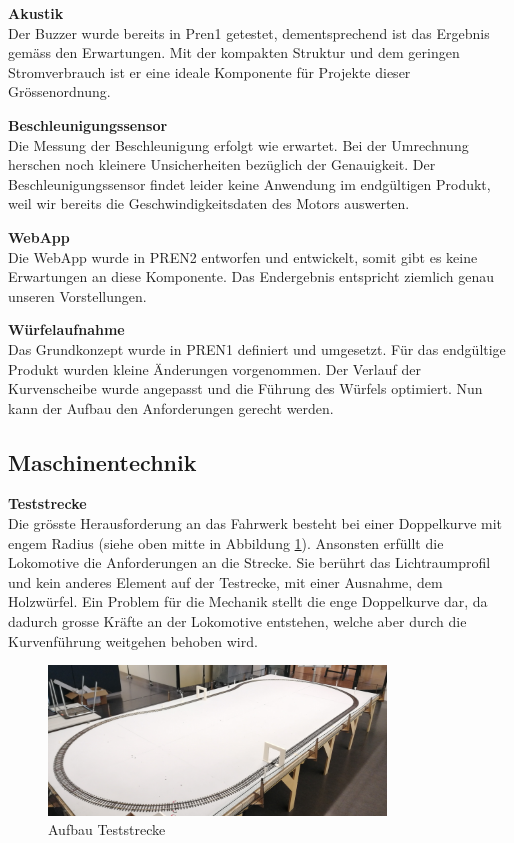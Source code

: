 \documentclass[../../main.tex]{subfiles}
\begin{document}
\textbf{Akustik}\\
Der Buzzer wurde bereits in Pren1 getestet, dementsprechend ist das Ergebnis gemäss den Erwartungen. Mit der kompakten Struktur und dem geringen Stromverbrauch ist er eine ideale Komponente für Projekte dieser Grössenordnung.

\textbf{Beschleunigungssensor}\\
Die Messung der Beschleunigung erfolgt wie erwartet. Bei der Umrechnung herschen noch kleinere Unsicherheiten bezüglich der Genauigkeit. Der Beschleunigungssensor findet leider keine Anwendung im endgültigen Produkt, weil wir bereits die Geschwindigkeitsdaten des Motors auswerten.

\textbf{WebApp}\\
Die WebApp wurde in PREN2 entworfen und entwickelt, somit gibt es keine Erwartungen an diese Komponente. Das Endergebnis entspricht ziemlich genau unseren Vorstellungen.

\textbf{Würfelaufnahme}\\
Das Grundkonzept wurde in PREN1 definiert und umgesetzt. Für das endgültige Produkt wurden kleine Änderungen vorgenommen. Der Verlauf der Kurvenscheibe wurde angepasst und die Führung des Würfels optimiert. Nun kann der Aufbau den Anforderungen gerecht werden. 

\pagebreak

\subsection{Maschinentechnik}

\textbf{Teststrecke}\\
Die grösste Herausforderung an das Fahrwerk besteht bei einer Doppelkurve mit engem Radius (siehe oben mitte in Abbildung \ref{fig:teststrecke1}). Ansonsten erfüllt die Lokomotive die Anforderungen an die Strecke. Sie berührt das Lichtraumprofil und kein anderes Element auf der Testrecke, mit einer Ausnahme, dem Holzwürfel. Ein Problem für die Mechanik stellt die enge Doppelkurve dar, da dadurch grosse Kräfte an der Lokomotive entstehen, welche aber durch die Kurvenführung weitgehen behoben wird.\\

\begin{figure}[H]
    \centering
    \includegraphics[width=0.8\textwidth]{teststrecke1.PNG}
    \caption {Aufbau Teststrecke}
    \label{fig:teststrecke1}
  \end{figure}
\end{document}
